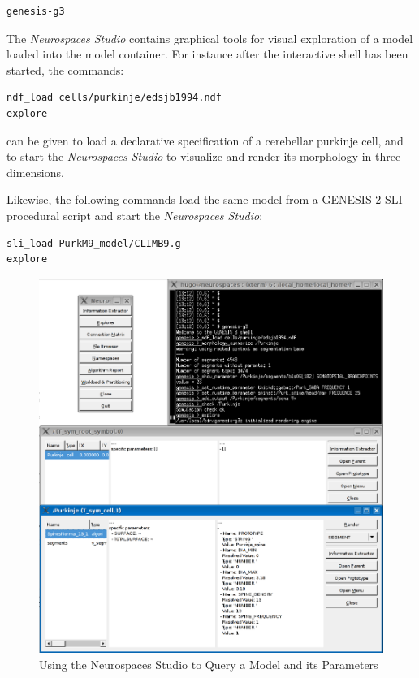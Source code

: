 \documentclass[12pt]{article}
\begin{document}
{\footnotesize
\begin{verbatim}
genesis-g3
\end{verbatim}
}

The {\it Neurospaces Studio} contains graphical tools for visual
exploration of a model loaded into the model container.  For instance
after the interactive shell has been started, the commands:

{\footnotesize
\begin{verbatim}
ndf_load cells/purkinje/edsjb1994.ndf
explore
\end{verbatim}
}

can be given to load a declarative specification of a cerebellar
purkinje cell, and to start the {\it Neurospaces Studio} to visualize
and render its morphology in three dimensions.

Likewise, the following commands load the same model from a
GENESIS 2 SLI procedural script and start the {\it Neurospaces
  Studio}:

{\footnotesize
\begin{verbatim}
sli_load PurkM9_model/CLIMB9.g
explore
\end{verbatim}
}


\begin{figure}[ht]
  \centering
  \includegraphics[scale=0.3]{figures/studio-screenshot.eps}
  \caption{Using the Neurospaces Studio to Query a Model and its
    Parameters}
  \label{fig:cbi-studio}
\end{figure}
\end{document}
